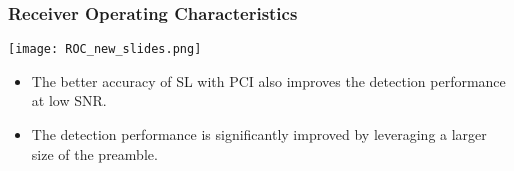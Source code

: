 \begin{frame}
  \frametitle{Receiver Operating Characteristics}

    \begin{center}
      \texttt{[image: ROC\_new\_slides.png]}
    \end{center}

    \begin{itemize}
    
      \item The better accuracy of SL with PCI also improves the detection performance at low SNR.
      \item The detection performance is significantly improved by leveraging a larger size of the preamble.

    \end{itemize}

\end{frame}